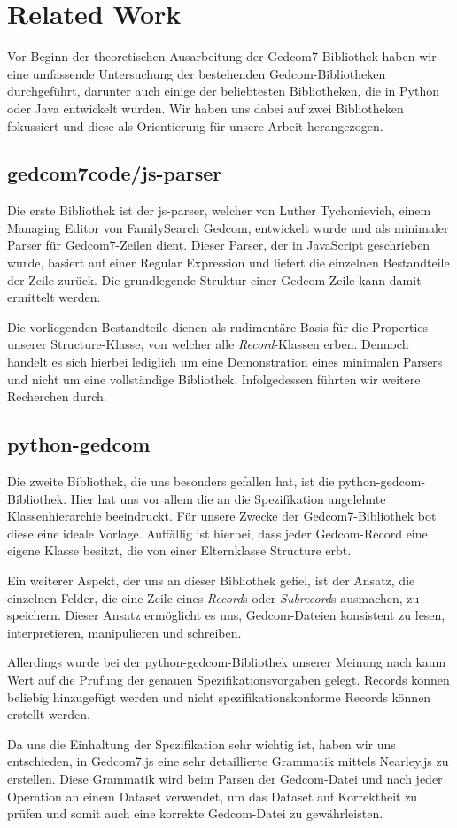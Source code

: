 \chapter{Related Work}
\label{chap: Related Work}
Vor Beginn der theoretischen Ausarbeitung der Gedcom7-Bibliothek haben wir eine umfassende Untersuchung der bestehenden 
Gedcom-Bibliotheken durchgeführt, darunter auch einige der beliebtesten Bibliotheken, die in Python oder Java entwickelt wurden. 
Wir haben uns dabei auf zwei Bibliotheken fokussiert und diese als Orientierung für unsere Arbeit herangezogen.

\section{gedcom7code/js-parser}

Die erste Bibliothek ist der js-parser, welcher von Luther Tychonievich, einem Managing Editor von FamilySearch Gedcom,
entwickelt wurde und als minimaler Parser für Gedcom7-Zeilen dient. Dieser Parser, der in JavaScript geschrieben wurde,
basiert auf einer Regular Expression und liefert die einzelnen Bestandteile der Zeile zurück. Die grundlegende Struktur einer 
Gedcom-Zeile kann damit ermittelt werden.

Die vorliegenden Bestandteile dienen als rudimentäre Basis für die Properties unserer Structure-Klasse, von welcher alle 
\emph{Record}-Klassen erben. Dennoch handelt es sich hierbei lediglich um eine Demonstration eines minimalen Parsers und nicht um eine vollständige Bibliothek. Infolgedessen führten wir weitere Recherchen durch.

\section{python-gedcom}

Die zweite Bibliothek, die uns besonders gefallen hat, ist die python-gedcom-Bibliothek. Hier hat uns vor allem die an die 
Spezifikation angelehnte Klassenhierarchie beeindruckt. Für unsere Zwecke der Gedcom7-Bibliothek bot diese eine ideale Vorlage.
Auffällig ist hierbei, dass jeder Gedcom-Record eine eigene Klasse besitzt, die von einer Elternklasse Structure erbt.

Ein weiterer Aspekt, der uns an dieser Bibliothek gefiel, ist der Ansatz, die einzelnen Felder, die eine Zeile eines \emph{Record}s 
oder \emph{Subrecord}s ausmachen, zu speichern. Dieser Ansatz ermöglicht es uns, Gedcom-Dateien konsistent zu lesen, interpretieren,
manipulieren und schreiben.

Allerdings wurde bei der python-gedcom-Bibliothek unserer Meinung nach kaum Wert auf die Prüfung der genauen Spezifikationsvorgaben
gelegt. Records können beliebig hinzugefügt werden und nicht spezifikationskonforme Records können erstellt werden.

Da uns die Einhaltung der Spezifikation sehr wichtig ist, haben wir uns entschieden, in Gedcom7.js eine sehr detaillierte Grammatik
mittels Nearley.js zu erstellen. Diese Grammatik wird beim Parsen der Gedcom-Datei und nach jeder Operation an einem Dataset 
verwendet, um das Dataset auf Korrektheit zu prüfen und somit auch eine korrekte Gedcom-Datei zu gewährleisten.